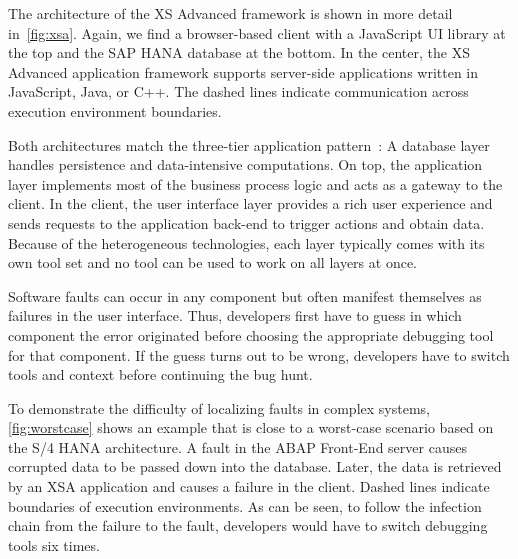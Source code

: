 The architecture of the XS Advanced framework is shown in more detail in~\cref{fig:xsa}.
Again, we find a browser-based client with a JavaScript UI library at the top and the SAP HANA database at the bottom.
In the center, the XS Advanced application framework supports server-side applications written in JavaScript, Java, or C++.
The dashed lines indicate communication across execution environment boundaries.

Both architectures match the three-tier application pattern~\cite{fowler02:patterns_of_enterprise_application}:
A database layer handles persistence and data-intensive computations.
On top, the application layer implements most of the business process logic and acts as a gateway to the client.
In the client, the user interface layer provides a rich user experience and sends requests to the application back-end to trigger actions and obtain data.
Because of the heterogeneous technologies, each layer typically comes with its own tool set and no tool can be used to work on all layers at once.


Software faults can occur in any component but often manifest themselves as failures in the user interface.
Thus, developers first have to guess in which component the error originated before choosing the appropriate debugging tool for that component.
If the guess turns out to be wrong, developers have to switch tools and context before continuing the bug hunt.

To demonstrate the difficulty of localizing faults in complex systems, \cref{fig:worstcase} shows an example that is close to a worst-case scenario based on the S/4 HANA architecture.
A fault in the ABAP Front-End server causes corrupted data to be passed down into the database.
Later, the data is retrieved by an XSA application and causes a failure in the client.
Dashed lines indicate boundaries of execution environments.
As can be seen, to follow the infection chain from the failure to the fault, developers would have to switch debugging tools six times.

